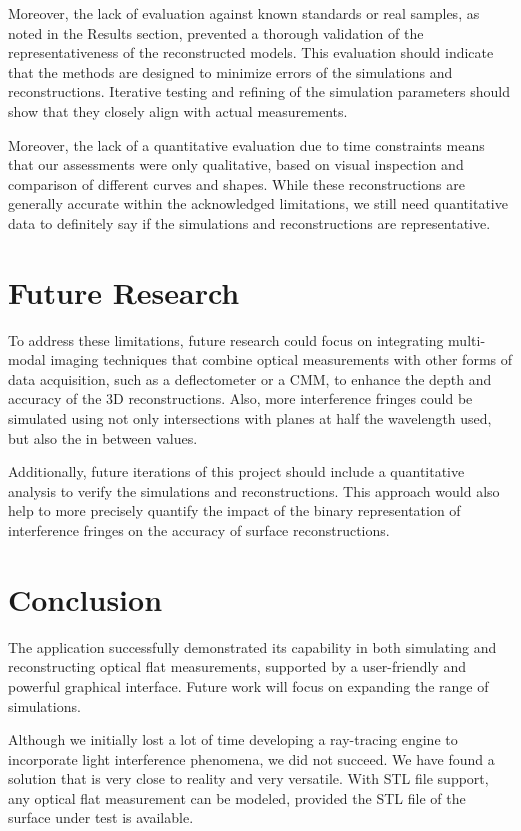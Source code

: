 \documentclass[../main.tex]{subfiles}
\begin{document}
Moreover, the lack of evaluation against known standards or real samples, as noted in the Results section, prevented a thorough validation of the representativeness of the reconstructed models. This evaluation should indicate that the methods are designed to minimize errors of the simulations and reconstructions. Iterative testing and refining of the simulation parameters should show that they closely align with actual measurements.

Moreover, the lack of a quantitative evaluation due to time constraints means that our assessments were only qualitative, based on visual inspection and comparison of different curves and shapes. While these reconstructions are generally accurate within the acknowledged limitations, we still need quantitative data to definitely say if the simulations and reconstructions are representative.
\vspace{-15pt}
\section{Future Research}
\vspace{-15pt}
To address these limitations, future research could focus on integrating multi-modal imaging techniques that combine optical measurements with other forms of data acquisition, such as a deflectometer or a CMM, to enhance the depth and accuracy of the 3D reconstructions. Also, more interference fringes could be simulated using not only intersections with planes at half the wavelength used, but also the in between values.

Additionally, future iterations of this project should include a quantitative analysis to verify the simulations and reconstructions. This approach would also help to more precisely quantify the impact of the binary representation of interference fringes on the accuracy of surface reconstructions.
\vspace{-15pt}
\section{Conclusion}
\vspace{-15pt}
The application successfully demonstrated its capability in both simulating and reconstructing optical flat measurements, supported by a user-friendly and powerful graphical interface. Future work will focus on expanding the range of simulations.

Although we initially lost a lot of time developing a ray-tracing engine to incorporate light interference phenomena, we did not succeed. We have found a solution that is very close to reality and very versatile. With STL file support, any optical flat measurement can be modeled, provided the STL file of the surface under test is available. 
\end{document}
